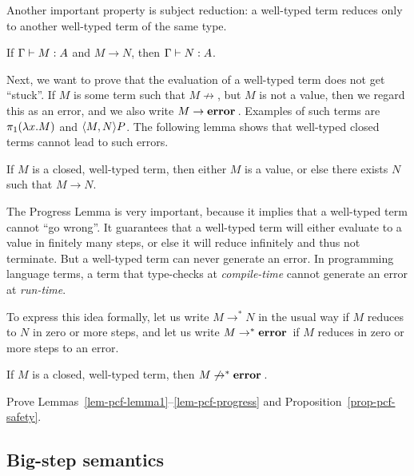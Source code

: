 \documentclass{article}
\begin{document}
Another important property is subject reduction: a well-typed term
reduces only to another well-typed term of the same type.

\begin{lemma}
  If $\Gamma\vdash M:A$ and $M\to N$, then $\Gamma\vdash N:A$. 
\end{lemma}

Next, we want to prove that the evaluation of a well-typed term does
not get ``stuck''. If $M$ is some term such that $M\not\to$, but $M$
is not a value, then we regard this as an error, and we also write
$M\to\mathop{\textbf{\bf error}\,}$. Examples of such terms are $\pi_1(\lambda x.M)$ and
$\langle M,N\rangle P$. The following lemma shows that well-typed closed terms
cannot lead to such errors.

\begin{lemma}[Progress]\label{lem-pcf-progress}
  If $M$ is a closed, well-typed term, then either $M$ is a value, or
  else there exists $N$ such that $M\to N$.
\end{lemma}

The Progress Lemma is very important, because it implies that a
well-typed term cannot ``go wrong''. It guarantees that a well-typed
term will either evaluate to a value in finitely many steps, or else
it will reduce infinitely and thus not terminate. But a well-typed
term can never generate an error. In programming language terms, a
term that type-checks at {\em compile-time} cannot generate an error
at {\em run-time}.

To express this idea formally, let us write $M\to^* N$ in the usual
way if $M$ reduces to $N$ in zero or more steps, and let us write
$M\to^*\mathop{\textbf{\bf error}\,}$ if $M$ reduces in zero or more steps to an error.

\begin{proposition}[Safety]\label{prop-pcf-safety}
  If $M$ is a closed, well-typed term, then $M\not\to^*\mathop{\textbf{\bf error}\,}$.
\end{proposition}

\begin{exercise}
  Prove Lemmas~\ref{lem-pcf-lemma1}--\ref{lem-pcf-progress} and
  Proposition~\ref{prop-pcf-safety}.
\end{exercise}

\subsection{Big-step semantics}
\end{document}

